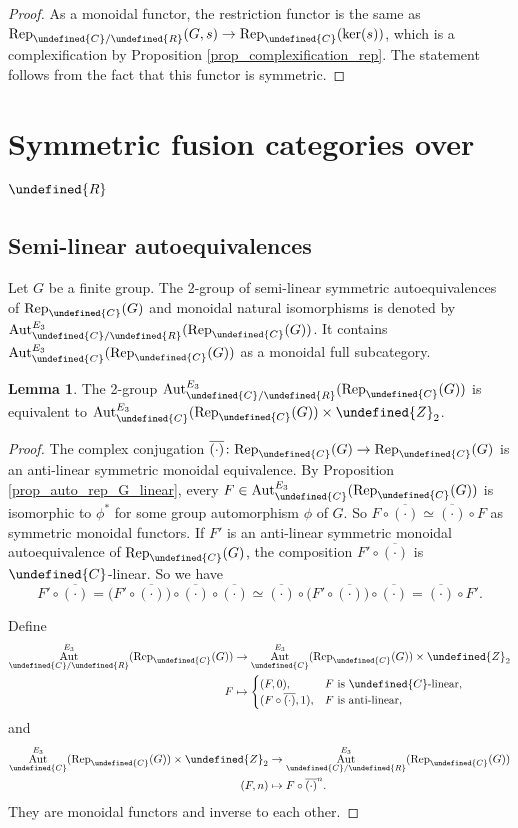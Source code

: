 \documentclass[10pt]{article}
\let\mathbb\undefined
\theoremstyle{definition}
\newtheorem{lem}[thm]{Lemma}
\numberwithin{equation}{section}
\numberwithin{thm}{section}
\newcommand{\pf}{\begin{proof}}
\newcommand{\epf}{\end{proof}}
\newcommand{\Cb}{\mathbb{C}}
\newcommand{\Rb}{\mathbb{R}}
\newcommand{\Zb}{\mathbb{Z}}
\DeclareMathOperator{\Aut}{Aut}
\newcommand{\rep}{\mathrm{Rep}}
\begin{document}
\pf
As a monoidal functor, the restriction functor is the same as $\rep_{\Cb/\Rb}(G,s) \to \rep_\Cb(\ker(s))$, which is a complexification by Proposition \ref{prop_complexification_rep}. The statement follows from the fact that this functor is symmetric.
\epf

\section{Symmetric fusion categories over \texorpdfstring{$\Rb$}{R}} \label{sec_symmetric_fusion_R}

\subsection{Semi-linear autoequivalences}

Let $G$ be a finite group. The 2-group of semi-linear symmetric autoequivalences of $\rep_\Cb(G)$ and monoidal natural isomorphisms is denoted by $\Aut_{\Cb/\Rb}^{E_3}(\rep_\Cb(G))$. It contains $\Aut_\Cb^{E_3}(\rep_\Cb(G))$ as a monoidal full subcategory.

\begin{lem} \label{lem_auto_rep_G_semi_linear}
The 2-group $\Aut_{\Cb/\Rb}^{E_3}(\rep_\Cb(G))$ is equivalent to $\Aut_\Cb^{E_3}(\rep_\Cb(G)) \times \Zb_2$.
\end{lem}

\pf
The complex conjugation $\overline{(\cdot)} \colon \rep_\Cb(G) \to \rep_\Cb(G)$ is an anti-linear symmetric monoidal equivalence. By Proposition \ref{prop_auto_rep_G_linear}, every $F \in \Aut_\Cb^{E_3}(\rep_\Cb(G))$ is isomorphic to $\phi^*$ for some group automorphism $\phi$ of $G$. So $F \circ \overline{(\cdot)} \simeq \overline{(\cdot)} \circ F$ as symmetric monoidal functors. If $F'$ is an anti-linear symmetric monoidal autoequivalence of $\rep_\Cb(G)$, the composition $F' \circ \overline{(\cdot)}$ is $\Cb$-linear. So we have
\[
F' \circ \overline{(\cdot)} = \bigl(F' \circ \overline{(\cdot)}\bigr) \circ \overline{(\cdot)} \circ \overline{(\cdot)} \simeq \overline{(\cdot)} \circ \bigl(F' \circ \overline{(\cdot)}\bigr) \circ \overline{(\cdot)} = \overline{(\cdot)} \circ F' .
\]

Define
\begin{align*}
\Aut_{\Cb/\Rb}^{E_3}(\rep_\Cb(G)) & \to \Aut_\Cb^{E_3}(\rep_\Cb(G)) \times \Zb_2 \\
F & \mapsto \begin{cases}
(F,0) , & F \text{ is $\Cb$-linear}, \\
(F \circ \overline{(\cdot)},1) , & F \text{ is anti-linear} ,
\end{cases}
\end{align*}
and
\begin{align*}
\Aut_\Cb^{E_3}(\rep_\Cb(G)) \times \Zb_2 & \to \Aut_{\Cb/\Rb}^{E_3}(\rep_\Cb(G)) \\
(F,n) & \mapsto F \circ \overline{(\cdot)}^n .
\end{align*}
They are monoidal functors and inverse to each other.
\epf
\end{document}
